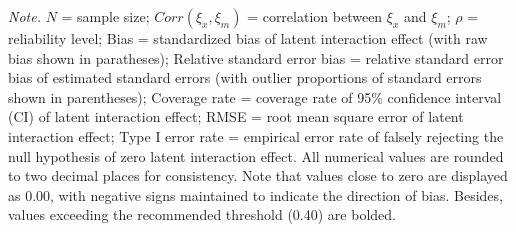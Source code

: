 \documentclass[
  man]{apa6}
\newenvironment{lltable}{\begin{landscape}\centering\begin{ThreePartTable}}{\end{ThreePartTable}\end{landscape}}
\begin{document}
\begin{lltable}

\begin{TableNotes}[para]
\normalsize{\textit{Note.} $\textit{N}$ = sample size; $Corr(\xi_{x}, \xi_{m})$ = correlation between $\xi_{x}$ and $\xi_{m}$; $\rho$ = reliability level; Bias = standardized bias of latent interaction effect (with raw bias shown in paratheses); Relative standard error bias = relative standard error bias of estimated standard errors (with outlier proportions of standard errors shown in parentheses); Coverage rate = coverage rate of 95$\%$ confidence interval (CI) of latent interaction effect; RMSE = root mean square error of latent interaction effect; Type I error rate = empirical error rate of falsely rejecting the null hypothesis of zero latent interaction effect. All numerical values are rounded to two decimal places for consistency. Note that values close to zero are displayed as 0.00, with negative signs maintained to indicate the direction of bias. Besides, values exceeding the recommended threshold (0.40) are bolded.}
\end{TableNotes}

\tiny{

}
\end{lltable}
\end{document}
